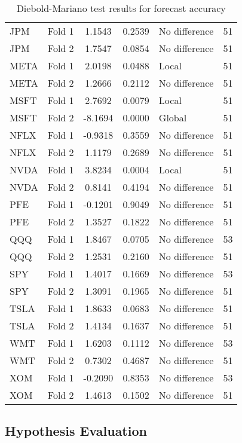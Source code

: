 \documentclass[12pt]{report}
\begin{document}
\begin{table}[H]
\begin{tabular}{|l|l|c|c|l|c|}
JPM & Fold 1 & 1.1543 & 0.2539 & No difference & 51 \\
JPM & Fold 2 & 1.7547 & 0.0854 & No difference & 51 \\
META & Fold 1 & 2.0198 & 0.0488 & Local  & 51 \\
META & Fold 2 & 1.2666 & 0.2112 & No difference & 51 \\
MSFT & Fold 1 & 2.7692 & 0.0079 & Local  & 51 \\
MSFT & Fold 2 & -8.1694 & 0.0000 & Global  & 51 \\
NFLX & Fold 1 & -0.9318 & 0.3559 & No difference & 51 \\
NFLX & Fold 2 & 1.1179 & 0.2689 & No difference & 51 \\
NVDA & Fold 1 & 3.8234 & 0.0004 & Local & 51 \\
NVDA & Fold 2 & 0.8141 & 0.4194 & No difference & 51 \\
PFE & Fold 1 & -0.1201 & 0.9049 & No difference & 51 \\
PFE & Fold 2 & 1.3527 & 0.1822 & No difference & 51 \\
QQQ & Fold 1 & 1.8467 & 0.0705 & No difference & 53 \\
QQQ & Fold 2 & 1.2531 & 0.2160 & No difference & 51 \\
SPY & Fold 1 & 1.4017 & 0.1669 & No difference & 53 \\
SPY & Fold 2 & 1.3091 & 0.1965 & No difference & 51 \\
TSLA & Fold 1 & 1.8633 & 0.0683 & No difference & 51 \\
TSLA & Fold 2 & 1.4134 & 0.1637 & No difference & 51 \\
WMT & Fold 1 & 1.6203 & 0.1112 & No difference & 53 \\
WMT & Fold 2 & 0.7302 & 0.4687 & No difference & 51 \\
XOM & Fold 1 & -0.2090 & 0.8353 & No difference & 53 \\
XOM & Fold 2 & 1.4613 & 0.1502 & No difference & 51 \\
\hline
\end{tabular}
\caption{Diebold-Mariano test results for forecast accuracy}
\label{tab:DM}
\end{table}


\subsection{Hypothesis Evaluation}
\end{document}
